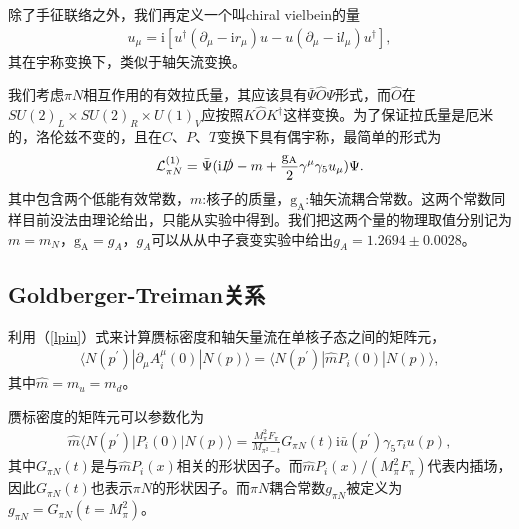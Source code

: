 \documentclass[aps,tightenlines,16pt]{ctexart}
\numberwithin{equation}{section}
\newcommand{\mL}{\mathcal{L}}
\begin{document}
除了手征联络之外，我们再定义一个叫chiral vielbein的量
\begin{align}
   u_{\mu}=\mbox{i}[u^{\dagger}(\partial_{\mu}-\mbox{i}r_{\mu})u-u(\partial_{\mu}-\mbox{i}l_{\mu})u^{\dagger}],
\end{align}
其在宇称变换下，类似于轴矢流变换。

我们考虑$\pi N$相互作用的有效拉氏量，其应该具有$\bar{\Psi}\hat{O}\Psi$形式，而$\hat{O}$在$SU(2)_L\times SU(2)_R \times U(1)_V$应按照$K\hat{O}K^{\dagger}$这样变换。为了保证拉氏量是厄米的，洛伦兹不变的，且在$C\text{、}P\text{、}T$变换下具有偶宇称，最简单的形式为\cite{gasser1988nucleons}
\begin{align}\label{lpin}
   \mL_{\pi N}^{(1)} = \bar{\Psi}(\mbox{i}\slashed{D}-m+\frac{\mathrm{g_A}}{2}\gamma^{\mu}\gamma_5u_{\mu})\Psi.
\end{align}
其中包含两个低能有效常数，$m$:核子的质量，$\mathrm{g_A}$:轴矢流耦合常数。这两个常数同样目前没法由理论给出，只能从实验中得到。{\color{blue}我们把这两个量的物理取值分别记为$m=m_N$，$\mathrm{g_A}=g_A$，$g_A$可以从从中子衰变实验中给出$g_A=1.2694\pm 0.0028$。}
\subsection{Goldberger-Treiman关系}
利用（\ref{lpin}）式来计算赝标密度和轴矢量流在单核子态之间的矩阵元，
\begin{align}
   \langle N(p^{\prime})|\partial_{\mu}A^{\mu}_i(0)|N(p)\rangle=\langle N(p^{\prime})|\hat{m}P_i(0)|N(p)\rangle,
\end{align}
其中$\hat{m}=m_u=m_d$。

赝标密度的矩阵元可以参数化为
\begin{align}\label{Gpin}
   \hat{m}\langle N(p^{\prime})|P_i(0)|N(p)\rangle=\frac{M_{\pi}^2F_{\pi}}{M_{\pi^2-t}}G_{\pi N}(t)\mbox{i}\bar{u}(p^{\prime})\gamma_5\tau_i u(p),
\end{align}
其中$G_{\pi N}(t)$是与$\hat{m}P_i(x)$相关的形状因子。而$\hat{m}P_i(x)/(M_{\pi}^2F_{\pi})$代表内插场，因此$G_{\pi N}(t)$也表示$\pi N$的形状因子。而$\pi N$耦合常数$g_{\pi N}$被定义为$g_{\pi N}=G_{\pi N}(t=M_{\pi}^2)$。
\end{document}
